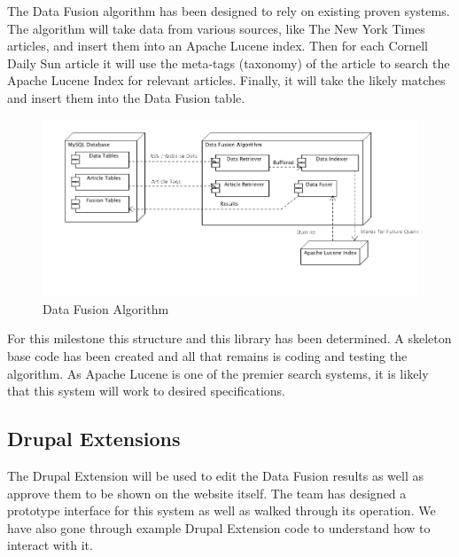 \documentclass[12pt]{article} %
\begin{document}
The Data Fusion algorithm has been designed to rely on existing proven systems. The algorithm will take data from various sources, like The New York Times articles, and insert them into an Apache Lucene index. Then for each Cornell Daily Sun article it will use the meta-tags (taxonomy) of the article to search the Apache Lucene Index for relevant articles. Finally, it will take the likely matches and insert them into the Data Fusion table.

\begin{figure}[htbp]
\begin{center}
\includegraphics[width=6in]{images/data_fusion_alg}
\caption{Data Fusion Algorithm}
\end{center}
\end{figure}

For this milestone this structure and this library has been determined. A skeleton base code has been created and all that remains is coding and testing the algorithm. As Apache Lucene is one of the premier search systems, it is likely that this system will work to desired specifications.

\subsection{Drupal Extensions}

The Drupal Extension will be used to edit the Data Fusion results as well as approve them to be shown on the website itself. The team has designed a prototype interface for this system as well as walked through its operation. We have also gone through example Drupal Extension code to understand how to interact with it.
       
\end{document}
